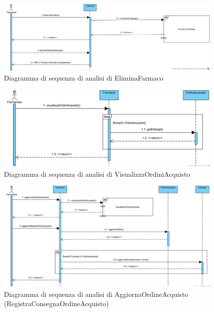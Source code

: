 \begin{figure}[!hbp]
	\centering
	\includegraphics[width=\linewidth]{assets/sequence_analisi/SequenceAnalisiEliminaFarmaco.png}
	\caption{Diagramma di sequenza di analisi di EliminaFarmaco}
\end{figure}

\begin{figure}[!hbp]
	\centering
	\includegraphics[width=0.9\linewidth]{assets/sequence_analisi/SequenceAnalisiVisualizzaOrdiniAcquisto.png}
	\caption{Diagramma di sequenza di analisi di VisualizzaOrdiniAcquisto}
\end{figure}

\begin{figure}[!hbp]
	\centering
	\includegraphics[width=\linewidth]{assets/sequence_analisi/SequenceAnalisiAggiornaOrdineAcquisto.png}
	\caption{Diagramma di sequenza di analisi di AggiornaOrdineAcquisto (RegistraConsegnaOrdineAcquisto)}
\end{figure}

